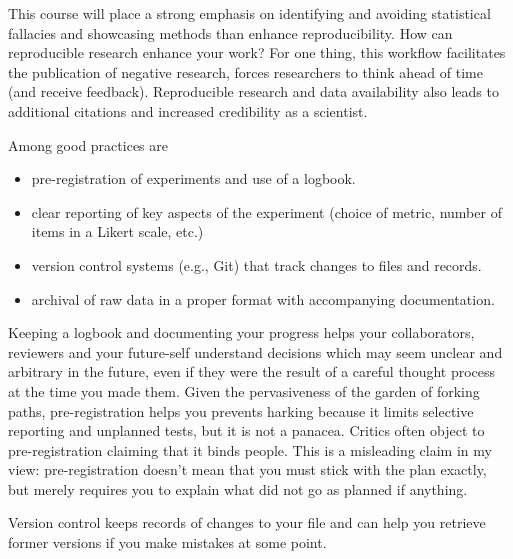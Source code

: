 \documentclass[
  11pt,
  letterpaper,
]{scrbook}
\providecommand{\tightlist}{%
  \setlength{\itemsep}{0pt}\setlength{\parskip}{0pt}}\usepackage{longtable,booktabs,array}
\theoremstyle{definition}
\theoremstyle{definition}
\theoremstyle{remark}
\begin{document}
This course will place a strong emphasis on identifying and avoiding
statistical fallacies and showcasing methods than enhance
reproducibility. How can reproducible research enhance your work? For
one thing, this workflow facilitates the publication of negative
research, forces researchers to think ahead of time (and receive
feedback). Reproducible research and data availability also leads to
additional citations and increased credibility as a scientist.

Among good practices are

\begin{itemize}
\tightlist
\item
  pre-registration of experiments and use of a logbook.
\item
  clear reporting of key aspects of the experiment (choice of metric,
  number of items in a Likert scale, etc.)
\item
  version control systems (e.g., Git) that track changes to files and
  records.
\item
  archival of raw data in a proper format with accompanying
  documentation.
\end{itemize}

Keeping a logbook and documenting your progress helps your
collaborators, reviewers and your future-self understand decisions which
may seem unclear and arbitrary in the future, even if they were the
result of a careful thought process at the time you made them. Given the
pervasiveness of the garden of forking paths, pre-registration helps you
prevents harking because it limits selective reporting and unplanned
tests, but it is not a panacea. Critics often object to pre-registration
claiming that it binds people. This is a misleading claim in my view:
pre-registration doesn't mean that you must stick with the plan exactly,
but merely requires you to explain what did not go as planned if
anything.

Version control keeps records of changes to your file and can help you
retrieve former versions if you make mistakes at some point.
\end{document}
